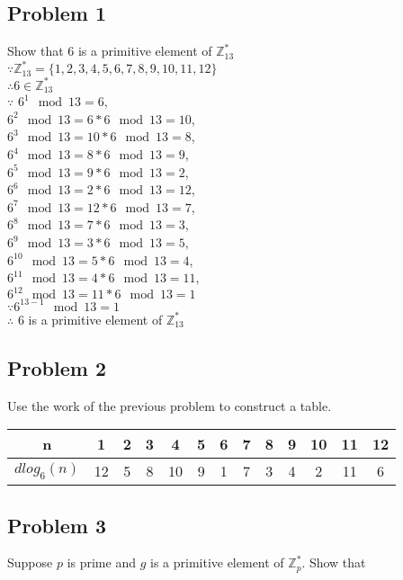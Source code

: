 \documentclass[paper=a4, fontsize=11pt]{scrartcl} %
\numberwithin{equation}{section} %
\numberwithin{figure}{section} %
\newcommand{\problem}[1]{\subsection *{Problem #1}}
\newcommand{\Z}{\mathbb{Z}}
\begin{document}
\pagebreak
\problem 1
Show that 6 is a primitive element of $\Z_{13}^*$\\
$\because \Z_{13}^*=\{1, 2, 3, 4, 5, 6, 7, 8, 9, 10, 11, 12\}$\\
$\therefore 6 \in \Z_{13}^*$\\
$\because$
$6^1 \mod 13= 6$, \\
$6^2 \mod 13= 6 * 6 \mod 13 = 10$, \\
$6^3 \mod 13= 10 * 6 \mod 13 = 8$, \\
$6^4 \mod 13= 8 * 6 \mod 13 = 9$, \\
$6^5 \mod 13= 9 * 6 \mod 13 = 2$, \\
$6^6 \mod 13= 2 * 6 \mod 13 = 12$, \\
$6^7 \mod 13= 12 * 6 \mod 13 = 7$, \\
$6^8 \mod 13= 7 * 6 \mod 13 = 3$, \\
$6^9 \mod 13= 3 * 6 \mod 13 = 5$, \\
$6^{10} \mod 13= 5 * 6 \mod 13 = 4$, \\
$6^{11} \mod 13= 4 * 6 \mod 13 = 11$, \\
$6^{12} \mod 13= 11 * 6 \mod 13 = 1$\\
$\because 6^{13-1} \mod 13 = 1$\\
$\therefore$ 6 is a primitive element of $\Z_{13}^*$\\

\problem 2
Use the work of the previous problem to construct a table.\\
\begin{tabular}{ c || c | c | c | c | c | c | c | c | c | c | c | c }
  n & 1 & 2 & 3 & 4 & 5 & 6 & 7 & 8 & 9 & 10 & 11 & 12 \\
  \hline
  $dlog_6(n)$ & 12 & 5 & 8 & 10 & 9 & 1 & 7 & 3 & 4 & 2 & 11 & 6 \\
\end{tabular}

\problem 3
Suppose $p$ is prime and $g$ is a primitive element of $\Z_p^*$. Show that
\end{document}
